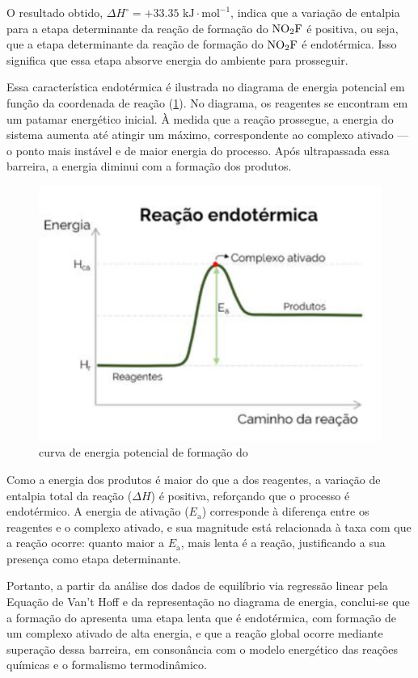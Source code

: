 O resultado obtido, $\Delta H^\circ = +33.35 \text{ kJ} \cdot \text{mol}^{-1}$, indica que a variação de entalpia para a etapa determinante da reação de formação do $\ce{NO2F}$ é positiva, ou seja, que a etapa determinante da reação de formação do $\ce{NO2F}$ é endotérmica. Isso significa que essa etapa absorve energia do ambiente para prosseguir.

Essa característica endotérmica é ilustrada no diagrama de energia potencial em função da coordenada de reação (\cref{diagrama}). No diagrama, os reagentes se encontram em um patamar energético inicial. À medida que a reação prossegue, a energia do sistema aumenta até atingir um máximo, correspondente ao complexo ativado — o ponto mais instável e de maior energia do processo. Após ultrapassada essa barreira, a energia diminui com a formação dos produtos.

    \begin{figure}[H]
        \centering
        \includegraphics[width=0.35\linewidth]{fig/grafico.png}
        \caption{curva de energia potencial de formação do }
        \label{diagrama}
    \end{figure}

Como a energia dos produtos é maior do que a dos reagentes, a variação de entalpia total da reação (\(\Delta H\)) é positiva, reforçando que o processo é endotérmico. A energia de ativação (\(E_\text{a}\)) corresponde à diferença entre os reagentes e o complexo ativado, e sua magnitude está relacionada à taxa com que a reação ocorre: quanto maior a \(E_\text{a}\), mais lenta é a reação, justificando a sua presença como etapa determinante.

Portanto, a partir da análise dos dados de equilíbrio via regressão linear pela Equação de Van't Hoff e da representação no diagrama de energia, conclui-se que a formação do  apresenta uma etapa lenta que é endotérmica, com formação de um complexo ativado de alta energia, e que a reação global ocorre mediante superação dessa barreira, em consonância com o modelo energético das reações químicas e o formalismo termodinâmico.

